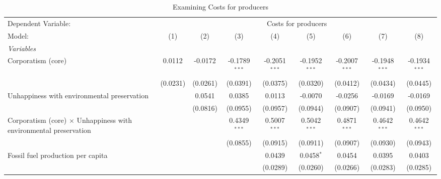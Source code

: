 
\begin{table}[htbp]
   \caption{Examining Costs for producers}
   \centering
   \begin{tabular}{lcccccccc}
      \tabularnewline \midrule \midrule
      Dependent Variable: & \multicolumn{8}{c}{Costs for producers}\\
      Model:                                                                   & (1)      & (2)      & (3)             & (4)             & (5)             & (6)             & (7)             & (8)\\  
      \midrule
      \emph{Variables}\\
      Corporatism (core)                                                       & 0.0112   & -0.0172  & -0.1789$^{***}$ & -0.2051$^{***}$ & -0.1952$^{***}$ & -0.2007$^{***}$ & -0.1948$^{***}$ & -0.1934$^{***}$\\   
                                                                               & (0.0231) & (0.0261) & (0.0391)        & (0.0375)        & (0.0320)        & (0.0412)        & (0.0434)        & (0.0445)\\   
      Unhappiness with environmental preservation                              &          & 0.0541   & 0.0385          & 0.0113          & -0.0070         & -0.0256         & -0.0169         & -0.0169\\   
                                                                               &          & (0.0816) & (0.0955)        & (0.0957)        & (0.0944)        & (0.0907)        & (0.0941)        & (0.0950)\\   
      Corporatism (core) $\times$ Unhappiness with environmental preservation  &          &          & 0.4349$^{***}$  & 0.5007$^{***}$  & 0.5042$^{***}$  & 0.4871$^{***}$  & 0.4642$^{***}$  & 0.4642$^{***}$\\   
                                                                               &          &          & (0.0855)        & (0.0915)        & (0.0911)        & (0.0907)        & (0.0930)        & (0.0943)\\   
      Fossil fuel production per capita                                        &          &          &                 & 0.0439          & 0.0458$^{*}$    & 0.0454          & 0.0395          & 0.0403\\   
                                                                               &          &          &                 & (0.0289)        & (0.0260)        & (0.0266)        & (0.0283)        & (0.0285)\\   

\end{tabular}
\end{table}
